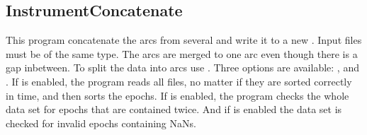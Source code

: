 \subsection{InstrumentConcatenate}\label{InstrumentConcatenate}
This program concatenate the arcs from several 
and write it to a new . Input files must be of the same type.
The arcs are merged to one arc even though there is a gap inbetween.
To split the data into arcs use .
Three options are available: ,  and .
If  is enabled, the program reads all files, no matter if they are sorted correctly in time, and
then sorts the epochs. If  is enabled, the program checks the whole data set
for epochs that are contained twice. And if  is enabled the data set is checked for
invalid epochs containing NaNs.


